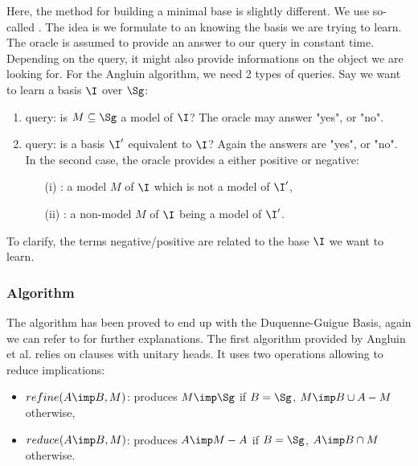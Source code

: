 Here, the method for building a minimal base is slightly different. We use 
so-called . The idea is we formulate 
to an  knowing the basis we are trying to learn. The oracle 
is assumed to provide an answer to our query in constant time. Depending on 
the query, it might also provide informations on the object we are looking for.
For the Angluin algorithm, we need 2 types of queries. Say we want to learn
a basis $\I$ over $\Sg$:
\begin{enumerate}
	\item {} query: is $M \subseteq \Sg$ a model of $\I$? The
	oracle may answer "yes", or "no".
	\item {} query: is a basis $\I'$ equivalent to $\I$? Again
	the answers are "yes", or "no". In the second case, the oracle provides a
	 either positive or negative:
	\begin{itemize}
		\item[(i)] : a model $M$ of $\I$ which is not a
		model of $\I'$,
		\item[(ii)] : a non-model $M$ of $\I$ being a model
		of $\I'$. 
	\end{itemize}
\end{enumerate}
\noindent To clarify, the terms negative/positive are related to the base $\I$
we want to learn.

\subsubsection{Algorithm}

The algorithm has been proved to end up with the Duquenne-Guigue Basis, again 
we can refer to \cite{angluin_learning_1992, arias_canonical_2009} for further
explanations. The first algorithm provided by Angluin et al. relies on clauses
with unitary heads. It uses two operations allowing to reduce implications:
\begin{itemize}
	\item $refine(A \imp B, M)$: produces $M \imp \Sg$ if $B = \Sg$, 
	$M \imp B \cup A - M$ otherwise,
	\item $reduce(A \imp B, M)$: produces $A \imp M - A$ if $B = \Sg$, 
	$A \imp B \cap M$ otherwise.
\end{itemize}

